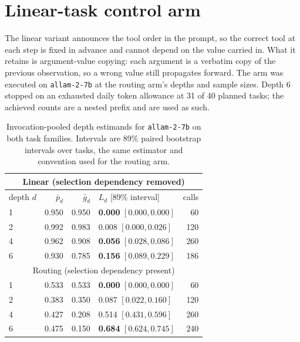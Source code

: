 \documentclass{article}
\begin{document}
\section{Linear-task control arm}
\label{app:linear}

The linear variant announces the tool order in the prompt, so the correct tool at each
step is fixed in advance and cannot depend on the value carried in. What it retains is
argument-value copying: each argument is a verbatim copy of the previous observation, so a
wrong value still propagates forward. The arm was executed on \texttt{allam-2-7b} at the
routing arm's depths and sample sizes. Depth 6 stopped on an exhausted daily token
allowance at 31 of 40 planned tasks; the achieved counts are a nested prefix and are used
as such.

\begin{table}[h]
\centering
\caption{Invocation-pooled depth estimands for \texttt{allam-2-7b} on both task families.
Intervals are 89\% paired bootstrap intervals over tasks, the same estimator and
convention used for the routing arm.}
\label{tab:linear-control}
\footnotesize
\begin{tabular}{@{}lrrlr@{}}
\toprule
\multicolumn{5}{c}{Linear (selection dependency removed)} \\
\midrule
depth $d$ & $\bar p_d$ & $\bar g_d$ & $L_d$ [89\% interval] & calls \\
\midrule
1 & 0.950 & 0.950 & \textbf{0.000} $[0.000,0.000]$ & 60 \\
2 & 0.992 & 0.983 & 0.008 $[0.000,0.026]$ & 120 \\
4 & 0.962 & 0.908 & \textbf{0.056} $[0.028,0.086]$ & 260 \\
6 & 0.930 & 0.785 & \textbf{0.156} $[0.089,0.229]$ & 186 \\
\midrule
\multicolumn{5}{c}{Routing (selection dependency present)} \\
\midrule
1 & 0.533 & 0.533 & \textbf{0.000} $[0.000,0.000]$ & 60 \\
2 & 0.383 & 0.350 & 0.087 $[0.022,0.160]$ & 120 \\
4 & 0.427 & 0.208 & 0.514 $[0.431,0.596]$ & 260 \\
6 & 0.475 & 0.150 & \textbf{0.684} $[0.624,0.745]$ & 240 \\
\bottomrule
\end{tabular}
\end{table}
\end{document}
